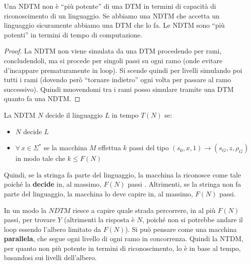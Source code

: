 \begin{definizione}
  Una NDTM non è ``più potente'' di una DTM in termini di capacità di
  riconoscimento di un linguaggio. Se abbiamo una NDTM che accetta un linguaggio
  sicuramente abbiamo una DTM che lo fa. Le NDTM sono ``più potenti'' in termini di tempo di computazione.
\end{definizione}
\begin{proof}
  La NDTM non viene simulata da una DTM procedendo per rami, concludendoli, ma
  si procede per singoli passi su ogni ramo (onde evitare d'incappare
  prematuramente in loop). Si scende quindi per livelli simulando poi tutti i
  rami (dovendo però ``tornare indietro'' ogni volta per passare al ramo
  successivo). Quindi muovendomi tra i rami posso simulare tramite una DTM
  quanto fa una NDTM.
\end{proof}
\begin{definizione}
  La NDTM $N$ decide il linguaggio $L$ in tempo $T(N)$ se:
  \begin{itemize}
    \item $N$ decide $L$
    \item $\forall\,x\in \Sigma^*$ se la macchina $M$ effettua $k$ passi del tipo $(s_0,x,1)\to(s_G, z, \rho_G)$ in modo tale che $k\leq F(N)$
  \end{itemize}
  Quindi, se la stringa fa parte del linguaggio, la macchina la riconosce come tale poiché la \textbf{decide} in, al massimo, $F(N)$ passi . Altrimenti, se la stringa non fa parte del linguaggio, la macchina lo deve capire in, al massimo, $F(N)$ passi.
\end{definizione}
In un modo la $NDTM$ riesce a capire quale strada percorrere, in al più $F(N)$ passi, per trovare $Y$ (altrimenti la risposta è $N$, poiché non si potrebbe andare il loop essendo l'albero limitato da $F(N)$). Si può pensare come una macchina \textbf{parallela}, che segue ogni livello di ogni ramo in concorrenza.
Quindi la NTDM, per quanto non più potente in termini di riconoscimento, lo è in
base al tempo, basandosi sui livelli dell'albero.

